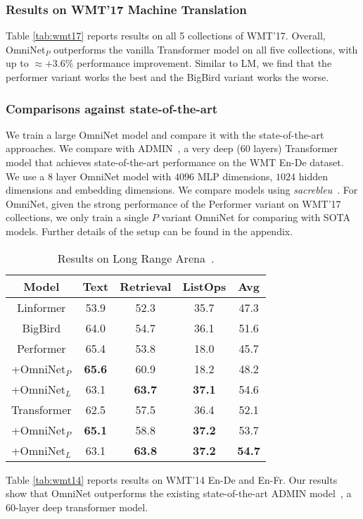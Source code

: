 \documentclass{article}
\begin{document}
\subsubsection{Results on WMT'17 Machine Translation}
Table \ref{tab:wmt17} reports results on all 5 collections of WMT'17. Overall, OmniNet$_P$ outperforms the vanilla Transformer model on all five collections, with up to $\approx+3.6\%$ performance improvement. Similar to LM, we find that the performer variant works the best and the BigBird variant works the worse.
\subsubsection{Comparisons against state-of-the-art} We train a large OmniNet model and compare it with the state-of-the-art approaches. We compare with ADMIN~\citep{liu2020very}, a very deep (60 layers) Transformer model that achieves state-of-the-art performance on the WMT En-De dataset. We use a $8$ layer OmniNet model with $4096$ MLP dimensions, $1024$ hidden dimensions and embedding dimensions. We compare models using \textit{sacrebleu}~\citep{post2018call}. For OmniNet, given the strong performance of the Performer variant on WMT'17 collections, we only train a single $P$ variant OmniNet for comparing with SOTA models. Further details of the setup can be found in the appendix.

\begin{table}[t!]
    \vspace{-5pt}
    \centering
    \caption{Results on Long Range Arena~\citep{tay2020long}.}
    \begin{tabular}{c|ccc|c}
    \toprule
       Model  & Text & Retrieval & ListOps &  Avg \\
       \midrule
       Linformer & 53.9 & 52.3 & 35.7 & 47.3 \\
       BigBird &  64.0 & 54.7 & 36.1 & 51.6 \\
       \midrule
       Performer & 65.4& 53.8 & 18.0 &  45.7  \\
       +OmniNet$_P$ & \textbf{65.6} & 60.9 &  18.2 & 48.2\\
       +OmniNet$_L$ & 63.1 & \textbf{63.7} & \textbf{37.1} & 54.6 \\ 
       \midrule
       Transformer  & 62.5 & 57.5 & 36.4 & 52.1 \\ 
       +OmniNet$_P$ & \textbf{65.1} & 58.8 & \textbf{37.2} & 53.7 \\
       +OmniNet$_L$ & 63.1 & \textbf{63.8} &\textbf{37.2} & \textbf{54.7} \\ 
       \bottomrule
    \end{tabular}
    \label{tab:lra_results}
    \vspace{-22pt}
\end{table}
Table \ref{tab:wmt14} reports results on WMT'14 En-De and En-Fr. Our results show that OmniNet outperforms the existing state-of-the-art ADMIN model~\citep{liu2020very}, a 60-layer deep transformer model. 
\end{document}
